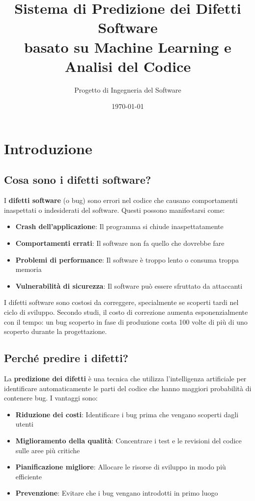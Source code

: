\documentclass[12pt,a4paper]{article}
\title{\textbf{Sistema di Predizione dei Difetti Software\\basato su Machine Learning e Analisi del Codice}}
\author{Progetto di Ingegneria del Software}
\date{\today}
\begin{document}
\maketitle

\tableofcontents
\newpage

\section{Introduzione}

\subsection{Cosa sono i difetti software?}

I \textbf{difetti software} (o bug) sono errori nel codice che causano comportamenti inaspettati o indesiderati del software. Questi possono manifestarsi come:
\begin{itemize}
    \item \textbf{Crash dell'applicazione}: Il programma si chiude inaspettatamente
    \item \textbf{Comportamenti errati}: Il software non fa quello che dovrebbe fare
    \item \textbf{Problemi di performance}: Il software è troppo lento o consuma troppa memoria
    \item \textbf{Vulnerabilità di sicurezza}: Il software può essere sfruttato da attaccanti
\end{itemize}

I difetti software sono costosi da correggere, specialmente se scoperti tardi nel ciclo di sviluppo. Secondo studi, il costo di correzione aumenta esponenzialmente con il tempo: un bug scoperto in fase di produzione costa 100 volte di più di uno scoperto durante la progettazione.

\subsection{Perché predire i difetti?}

La \textbf{predizione dei difetti} è una tecnica che utilizza l'intelligenza artificiale per identificare automaticamente le parti del codice che hanno maggiori probabilità di contenere bug. I vantaggi sono:

\begin{itemize}
    \item \textbf{Riduzione dei costi}: Identificare i bug prima che vengano scoperti dagli utenti
    \item \textbf{Miglioramento della qualità}: Concentrare i test e le revisioni del codice sulle aree più critiche
    \item \textbf{Pianificazione migliore}: Allocare le risorse di sviluppo in modo più efficiente
    \item \textbf{Prevenzione}: Evitare che i bug vengano introdotti in primo luogo
\end{itemize}
\end{document}

